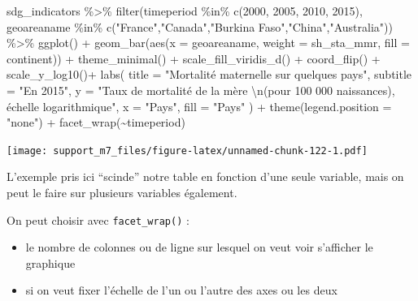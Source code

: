 \documentclass[
]{book}
\newenvironment{Shaded}{\begin{snugshade}}{\end{snugshade}}
\newcommand{\AttributeTok}[1]{\textcolor[rgb]{0.77,0.63,0.00}{#1}}
\newcommand{\DecValTok}[1]{\textcolor[rgb]{0.00,0.00,0.81}{#1}}
\newcommand{\FunctionTok}[1]{\textcolor[rgb]{0.00,0.00,0.00}{#1}}
\newcommand{\NormalTok}[1]{#1}
\newcommand{\SpecialCharTok}[1]{\textcolor[rgb]{0.00,0.00,0.00}{#1}}
\newcommand{\StringTok}[1]{\textcolor[rgb]{0.31,0.60,0.02}{#1}}
\providecommand{\tightlist}{%
  \setlength{\itemsep}{0pt}\setlength{\parskip}{0pt}}
\begin{document}
\begin{Shaded}
\begin{Highlighting}[]
\NormalTok{sdg\_indicators }\SpecialCharTok{\%\textgreater{}\%} 
  \FunctionTok{filter}\NormalTok{(timeperiod  }\SpecialCharTok{\%in\%} \FunctionTok{c}\NormalTok{(}\DecValTok{2000}\NormalTok{, }\DecValTok{2005}\NormalTok{, }\DecValTok{2010}\NormalTok{, }\DecValTok{2015}\NormalTok{),}
\NormalTok{         geoareaname }\SpecialCharTok{\%in\%} \FunctionTok{c}\NormalTok{(}\StringTok{"France"}\NormalTok{,}\StringTok{"Canada"}\NormalTok{,}\StringTok{"Burkina Faso"}\NormalTok{,}\StringTok{"China"}\NormalTok{,}\StringTok{"Australia"}\NormalTok{)) }\SpecialCharTok{\%\textgreater{}\%}
  \FunctionTok{ggplot}\NormalTok{() }\SpecialCharTok{+}
  \FunctionTok{geom\_bar}\NormalTok{(}\FunctionTok{aes}\NormalTok{(}\AttributeTok{x =}\NormalTok{ geoareaname, }\AttributeTok{weight =}\NormalTok{ sh\_sta\_mmr, }\AttributeTok{fill =}\NormalTok{ continent)) }\SpecialCharTok{+}
  \FunctionTok{theme\_minimal}\NormalTok{() }\SpecialCharTok{+}
  \FunctionTok{scale\_fill\_viridis\_d}\NormalTok{() }\SpecialCharTok{+}
  \FunctionTok{coord\_flip}\NormalTok{() }\SpecialCharTok{+}
  \FunctionTok{scale\_y\_log10}\NormalTok{()}\SpecialCharTok{+}
  \FunctionTok{labs}\NormalTok{(}
    \AttributeTok{title =} \StringTok{"Mortalité maternelle sur quelques pays"}\NormalTok{,}
    \AttributeTok{subtitle =} \StringTok{"En 2015"}\NormalTok{,}
    \AttributeTok{y =} \StringTok{"Taux de mortalité de la mère }\SpecialCharTok{\textbackslash{}n}\StringTok{(pour 100 000 naissances), échelle logarithmique"}\NormalTok{,}
    \AttributeTok{x =} \StringTok{"Pays"}\NormalTok{,}
    \AttributeTok{fill =} \StringTok{"Pays"}
\NormalTok{  ) }\SpecialCharTok{+}
  \FunctionTok{theme}\NormalTok{(}\AttributeTok{legend.position =} \StringTok{"none"}\NormalTok{) }\SpecialCharTok{+}
  \FunctionTok{facet\_wrap}\NormalTok{(}\SpecialCharTok{\textasciitilde{}}\NormalTok{timeperiod)}
\end{Highlighting}
\end{Shaded}

\texttt{[image: support\_m7\_files/figure-latex/unnamed-chunk-122-1.pdf]}

L'exemple pris ici ``scinde'' notre table en fonction d'une seule variable, mais on peut le faire sur plusieurs variables également.

On peut choisir avec \texttt{facet\_wrap()} :

\begin{itemize}
\tightlist
\item
  le nombre de colonnes ou de ligne sur lesquel on veut voir s'afficher le graphique
\item
  si on veut fixer l'échelle de l'un ou l'autre des axes ou les deux
\end{itemize}
\end{document}
